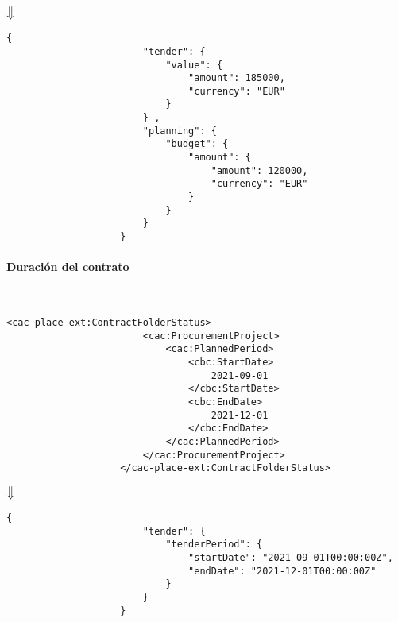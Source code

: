                 \begin{center}
                    $\big\Downarrow$
                \end{center}
                
                \begin{lstlisting}[language=lJSON]
                    {
                        "tender": {
                            "value": {
                                "amount": 185000,
                                "currency": "EUR"
                            }
                        } ,
                        "planning": {
                            "budget": {
                                "amount": {
                                    "amount": 120000,
                                    "currency": "EUR"
                                }
                            }
                        }
                    }
                \end{lstlisting}
\newpage
            \paragraph{Duración del contrato} \mbox{}\\
                \begin{lstlisting}[language=lXML]
                    <cac-place-ext:ContractFolderStatus>
                        <cac:ProcurementProject>
                            <cac:PlannedPeriod>
                                <cbc:StartDate>
                                    2021-09-01
                                </cbc:StartDate>
                                <cbc:EndDate>
                                    2021-12-01
                                </cbc:EndDate>
                            </cac:PlannedPeriod>
                        </cac:ProcurementProject>
                    </cac-place-ext:ContractFolderStatus>
                \end{lstlisting}
                
                \begin{center}
                    $\big\Downarrow$
                \end{center}
                
                \begin{lstlisting}[language=lJSON]
                    {
                        "tender": {
                            "tenderPeriod": {
                                "startDate": "2021-09-01T00:00:00Z",
                                "endDate": "2021-12-01T00:00:00Z"
                            }
                        }
                    }
                \end{lstlisting}
                
